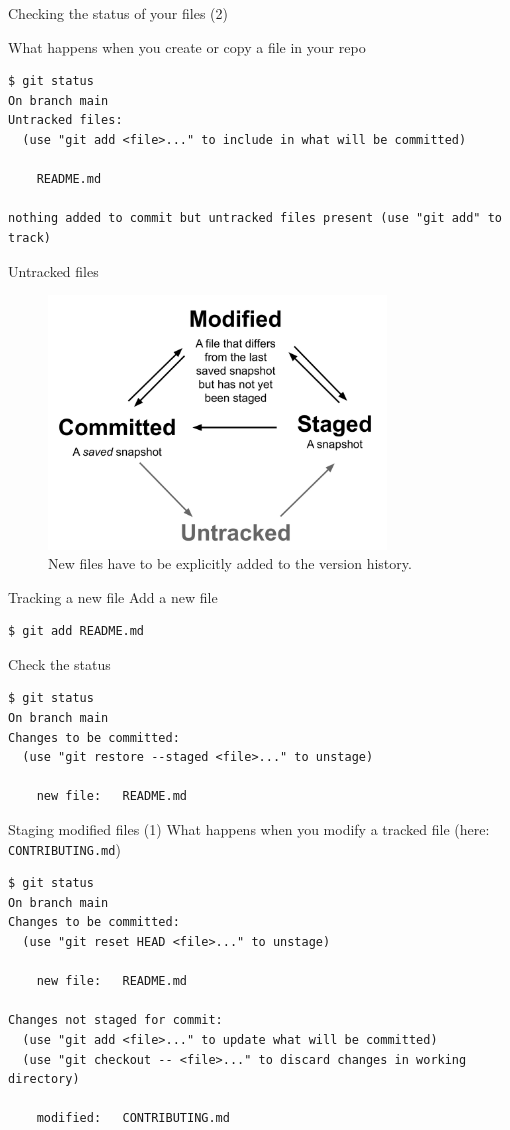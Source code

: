 \documentclass[handout]{beamer}
\begin{document}
\begin{frame}[fragile]{Checking the status of your files (2)}

What happens when you create or copy a file in your repo

\begin{lstlisting}
$ git status
On branch main
Untracked files:
  (use "git add <file>..." to include in what will be committed)

    README.md

nothing added to commit but untracked files present (use "git add" to track)
\end{lstlisting}
\end{frame}

\begin{frame}{Untracked files}
	\begin{figure}
		\includegraphics[width=0.8\textwidth]{figures/git_4states.pdf}
		\caption{New files have to be explicitly added to the version history.}
	\end{figure}
\end{frame}

\begin{frame}[fragile]{Tracking a new file}
Add a new file
\begin{lstlisting}
$ git add README.md    
\end{lstlisting}
Check the status 
\begin{lstlisting}
$ git status
On branch main
Changes to be committed:
  (use "git restore --staged <file>..." to unstage)

    new file:   README.md
\end{lstlisting}
\end{frame}

\begin{frame}[fragile]{Staging modified files (1)}
What happens when you modify a tracked file (here: \texttt{CONTRIBUTING.md})
\begin{lstlisting}
$ git status
On branch main
Changes to be committed:
  (use "git reset HEAD <file>..." to unstage)

    new file:   README.md

Changes not staged for commit:
  (use "git add <file>..." to update what will be committed)
  (use "git checkout -- <file>..." to discard changes in working directory)

    modified:   CONTRIBUTING.md
\end{lstlisting}
\end{frame}
\end{document}
